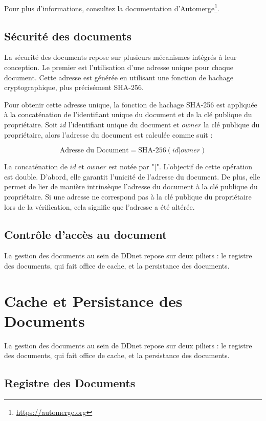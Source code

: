 Pour plus d'informations, consultez la documentation d'Automerge\footnote{\url{https://automerge.org}}.


\subsection{Sécurité des documents}

La sécurité des documents repose sur plusieurs mécanismes intégrés à leur conception. Le premier est l'utilisation d'une adresse unique pour chaque document. Cette adresse est générée en utilisant une fonction de hachage cryptographique, plus précisément SHA-256.

Pour obtenir cette adresse unique, la fonction de hachage SHA-256 est appliquée à la concaténation de l'identifiant unique du document et de la clé publique du propriétaire. Soit $id$ l'identifiant unique du document et $owner$ la clé publique du propriétaire, alors l'adresse du document est calculée comme suit :

\begin{equation}
  \text{Adresse du Document} = \text{SHA-256}(id | owner)
\end{equation}

La concaténation de $id$ et $owner$ est notée par "$|$". L'objectif de cette opération est double. D'abord, elle garantit l'unicité de l'adresse du document. De plus, elle permet de lier de manière intrinsèque l'adresse du document à la clé publique du propriétaire. Si une adresse ne correspond pas à la clé publique du propriétaire lors de la vérification, cela signifie que l'adresse a été altérée.

\subsection{Contrôle d'accès au document}

La gestion des documents au sein de \Gls{DDnet} repose sur deux piliers : le registre des documents, qui fait office de cache, et la persistance des documents.

\section{Cache et Persistance des Documents}

La gestion des documents au sein de \Gls{DDnet} repose sur deux piliers : le registre des documents, qui fait office de cache, et la persistance des documents.

\subsection{Registre des Documents}

